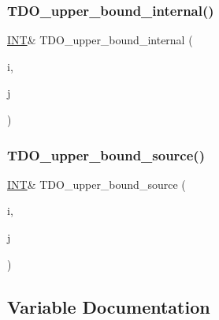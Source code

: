 \subsubsection{\texorpdfstring{T\+D\+O\+\_\+upper\+\_\+bound\+\_\+internal()}{TDO\_upper\_bound\_internal()}}
{\footnotesize\ttfamily \mbox{\hyperlink{galois_8h_a09fddde158a3a20bd2dcadb609de11dc}{I\+NT}}\& T\+D\+O\+\_\+upper\+\_\+bound\+\_\+internal (\begin{DoxyParamCaption}\item[{\mbox{\hyperlink{galois_8h_a09fddde158a3a20bd2dcadb609de11dc}{I\+NT}}}]{i,  }\item[{\mbox{\hyperlink{galois_8h_a09fddde158a3a20bd2dcadb609de11dc}{I\+NT}}}]{j }\end{DoxyParamCaption})}

\mbox{\label{_l_i_b_2_i_n_c_i_d_e_n_c_e_2packing_8_c_aa3bee45160906a54c31f818bc6f172d9}} 
\subsubsection{\texorpdfstring{T\+D\+O\+\_\+upper\+\_\+bound\+\_\+source()}{TDO\_upper\_bound\_source()}}
{\footnotesize\ttfamily \mbox{\hyperlink{galois_8h_a09fddde158a3a20bd2dcadb609de11dc}{I\+NT}}\& T\+D\+O\+\_\+upper\+\_\+bound\+\_\+source (\begin{DoxyParamCaption}\item[{\mbox{\hyperlink{galois_8h_a09fddde158a3a20bd2dcadb609de11dc}{I\+NT}}}]{i,  }\item[{\mbox{\hyperlink{galois_8h_a09fddde158a3a20bd2dcadb609de11dc}{I\+NT}}}]{j }\end{DoxyParamCaption})}



\subsection{Variable Documentation}
\mbox{\label{_l_i_b_2_i_n_c_i_d_e_n_c_e_2packing_8_c_a5e11ca4081363787ae484803f8208629}} 
